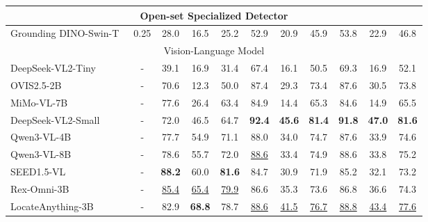 \begin{table}[t]
{\begin{tabular}{l|c|ccc|ccc|ccc}
\multicolumn{11}{c}{{Open-set Specialized Detector}} \\
\midrule
Grounding DINO-Swin-T~\citep{liu2023grounding} & 0.25 
& 28.0 & 16.5 & 25.2 
& 52.9 & 20.9 & 45.9 
& 53.8 & 22.9 & 46.8 \\
\midrule
\multicolumn{11}{c}{{Vision-Language Model}} \\
\midrule
DeepSeek-VL2-Tiny~\citep{wu2024deepseekvl2mixtureofexpertsvisionlanguagemodels} & - 
& 39.1 & 16.9 & 31.4 
& 67.4 & 16.1 & 50.5 
& 69.3 & 16.9 & 52.1 \\
OVIS2.5-2B~\citep{lu2025ovis25technicalreport} & - 
& 70.6 & 12.3 & 50.0 
& 87.4 & 29.3 & 73.4 
& 87.6 & 30.5 & 73.8 \\
MiMo-VL-7B~\citep{coreteam2025mimovltechnicalreport} & - 
& 77.6 & 26.4 & 63.4 
& 84.9 & 14.4 & 65.3 
& 84.6 & 14.9 & 65.5 \\
DeepSeek-VL2-Small~\citep{wu2024deepseekvl2mixtureofexpertsvisionlanguagemodels} & - 
& 72.0 & 46.5 & 64.7 
& \textbf{92.4} & \textbf{45.6} & \textbf{81.4} 
& \textbf{91.8} & \textbf{47.0} & \textbf{81.6} \\
Qwen3-VL-4B~\citep{bai2025qwen3vltechnicalreport} & - 
& 77.7 & 54.9 & 71.1
& 88.0 & 34.0 & 74.7
& 87.6 & 33.9 & 74.6 \\
Qwen3-VL-8B~\citep{bai2025qwen3vltechnicalreport} & -
& 78.6 & 55.7 & 72.0 
& \underline{88.6} & 33.4 & 74.9 
& 88.6 & 33.8 & 75.2 \\
SEED1.5-VL~\citep{guo2025seed15vltechnicalreport} & - 
& \textbf{88.2} & 60.0 & \textbf{81.6} 
& 84.7 & 30.9 & 71.9 
& 85.2 & 32.1 & 73.2 \\
Rex-Omni-3B~\citep{jiang2025rexomni} & - 
& \underline{85.4} & \underline{65.4} & \underline{79.9} 
& 86.6 & 35.3 & 73.6 
& 86.8 & 36.6 & 74.3 \\
\rowcolor{lightblue!10}
LocateAnything-3B & - 
& 82.9 & \textbf{68.8} & 78.7 
& \underline{88.6} & \underline{41.5} & \underline{76.7} 
& \underline{88.8} & \underline{43.4} & \underline{77.6} \\
\bottomrule
\end{tabular}
    }
    \label{tab:referring_detection}
\end{table}
